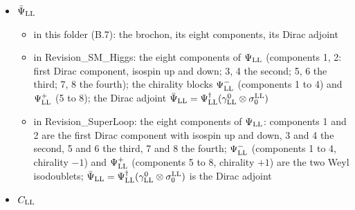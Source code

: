 \documentclass[
  10pt,
]{article}
\providecommand{\tightlist}{%
  \setlength{\itemsep}{0pt}\setlength{\parskip}{0pt}}
\begin{document}
\begin{itemize}
  \begin{itemize}
  \tightlist
  \item
    in this folder (B.7, D): the gauge field of
    \(U(1)^{\rm F}_{\rm LL}\)
  \item
    in Revision\_SM\_Higgs: the gauge field of
    \(U(1)^{\rm F}_{\rm LL}\): a real vector field on M31 (it enters the
    covariant derivative with \(+ig^{\rm F}_{\rm LL}F_{\rm LL}\))
  \item
    in Revision\_SuperLoop: -- (not listed)
  \end{itemize}
\item
  \(\bar\Psi_{\rm LL}\)

  \begin{itemize}
  \tightlist
  \item
    in this folder (B.7): the brochon, its eight components, its Dirac
    adjoint
  \item
    in Revision\_SM\_Higgs: the eight components of \(\Psi_{\rm LL}\)
    (components 1, 2: first Dirac component, isospin up and down; 3, 4
    the second; 5, 6 the third; 7, 8 the fourth); the chirality blocks
    \(\Psi^-_{\rm LL}\) (components 1 to 4) and \(\Psi^+_{\rm LL}\) (5
    to 8); the Dirac adjoint
    \(\bar\Psi_{\rm LL}=\Psi^\dagger_{\rm LL}(\gamma^0_{\rm LL}\otimes\sigma^{\rm LL}_0)\)
  \item
    in Revision\_SuperLoop: the eight components of \(\Psi_{\rm LL}\):
    components 1 and 2 are the first Dirac component with isospin up and
    down, 3 and 4 the second, 5 and 6 the third, 7 and 8 the fourth;
    \(\Psi^-_{\rm LL}\) (components 1 to 4, chirality \(-1\)) and
    \(\Psi^+_{\rm LL}\) (components 5 to 8, chirality \(+1\)) are the
    two Weyl isodoublets;
    \(\bar\Psi_{\rm LL}=\Psi^\dagger_{\rm LL}(\gamma^0_{\rm LL}\otimes\sigma^{\rm LL}_0)\)
    is the Dirac adjoint
  \end{itemize}
\item
  \(C_{\rm LL}\)


\end{itemize}
\end{document}
